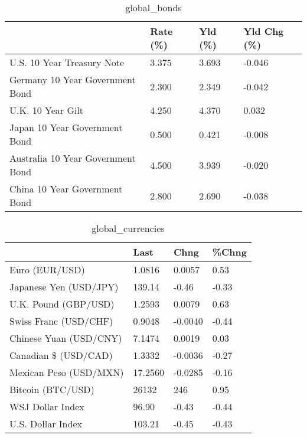 \documentclass{article}%
\begin{document}
%


\begin{table}[htbp]%
\caption{global\_bonds}%
\centering%
\begin{adjustbox}{width=1\textwidth}%
\begin{tabular}{llll}
\toprule
                                  & Rate (\%) & Yld (\%) & Yld Chg (\%) \\
\midrule
       U.S. 10 Year Treasury Note &    3.375 &   3.693 &      -0.046 \\
  Germany 10 Year Government Bond &    2.300 &   2.349 &      -0.042 \\
                U.K. 10 Year Gilt &    4.250 &   4.370 &       0.032 \\
    Japan 10 Year Government Bond &    0.500 &   0.421 &      -0.008 \\
Australia 10 Year Government Bond &    4.500 &   3.939 &      -0.020 \\
    China 10 Year Government Bond &    2.800 &   2.690 &      -0.038 \\
\bottomrule
\end{tabular}
%
\end{adjustbox}%
\end{table}

%


\begin{table}[htbp]%
\caption{global\_currencies}%
\centering%
\begin{adjustbox}{width=1\textwidth}%
\begin{tabular}{llll}
\toprule
                       &    Last &    Chng & \%Chng \\
\midrule
        Euro (EUR/USD) &  1.0816 &  0.0057 &  0.53 \\
Japanese Yen (USD/JPY) &  139.14 &   -0.46 & -0.33 \\
  U.K. Pound (GBP/USD) &  1.2593 &  0.0079 &  0.63 \\
 Swiss Franc (USD/CHF) &  0.9048 & -0.0040 & -0.44 \\
Chinese Yuan (USD/CNY) &  7.1474 &  0.0019 &  0.03 \\
  Canadian \$ (USD/CAD) &  1.3332 & -0.0036 & -0.27 \\
Mexican Peso (USD/MXN) & 17.2560 & -0.0285 & -0.16 \\
     Bitcoin (BTC/USD) &   26132 &     246 &  0.95 \\
      WSJ Dollar Index &   96.90 &   -0.43 & -0.44 \\
     U.S. Dollar Index &  103.21 &   -0.45 & -0.43 \\
\bottomrule
\end{tabular}
%
\end{adjustbox}%
\end{table}
\end{document}
